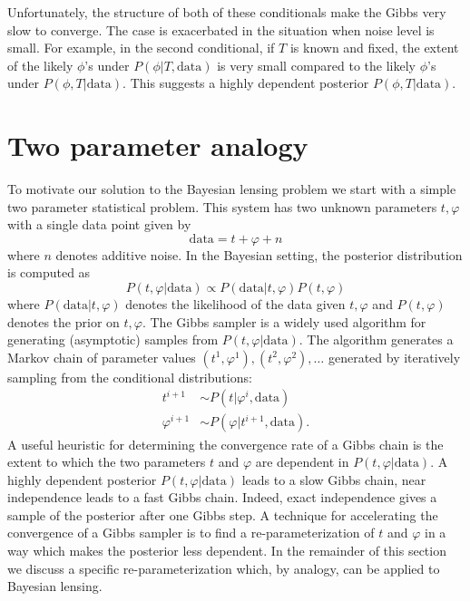 \documentclass[iop,revtex4,apj,onecolumn]{emulateapj}
\begin{document}
Unfortunately, the structure of both of these conditionals make the Gibbs very slow to converge. The case is exacerbated in the situation when noise level is small. For example, in the second conditional, if $T$ is known and fixed, the extent of the likely $\phi$'s under $P(\phi|T,\text{data})$  is very small compared to the likely $\phi$'s under $P(\phi, T| \text{data})$. 
This suggests a highly dependent posterior $P(\phi, T| \text{data})$. 










%
%
\section{Two parameter analogy}
\label{two parameter system}


To motivate our solution to the Bayesian lensing problem we start with a simple two parameter statistical problem.  This system has two unknown parameters $ t, \varphi$ with a single data point given by
\[\text{data} =  t + \varphi + n\]
where $n$ denotes additive noise.  In the Bayesian setting, the posterior distribution is computed as 
\begin{equation}
\label{post1}
 P( t,\varphi|\text{data})\propto P(\text{data}| t, \varphi) P( t,\varphi) 
 \end{equation}
where $P(\text{data}| t, \varphi)$ denotes the likelihood of the data given  $ t, \varphi$ and $P( t,\varphi)$ denotes the  prior on $ t, \varphi$. 
The Gibbs sampler is a widely used algorithm for generating (asymptotic) samples from  $P( t, \varphi|\text{data})$. The algorithm generates a Markov chain of parameter values $( t^{1}, \varphi^{1}), ( t^{2}, \varphi^{2}),\ldots$ generated by iteratively sampling from the conditional distributions:
\begin{align*}
 t^{i+1} &\sim P( t|\varphi^{i},\text{data}) \\
\varphi^{i+1}   &\sim P(\varphi| t^{i+1},\text{data}).
\end{align*}
A useful heuristic for determining the convergence rate of a Gibbs chain is the extent to which the two parameters $ t$ and $\varphi$ are dependent in $P(t, \varphi|\text{data})$. A highly dependent posterior $P( t, \varphi|\text{data})$ leads to a slow Gibbs chain, near independence leads to a fast Gibbs chain. Indeed, exact independence gives a sample of the posterior after one Gibbs step.  A technique for accelerating the convergence of a Gibbs sampler is to find a  re-parameterization of $ t$ and $\varphi$ in a way which makes the posterior less dependent. In the remainder of this section we discuss a specific re-parameterization which, by analogy, can be applied to Bayesian lensing.
\end{document}
